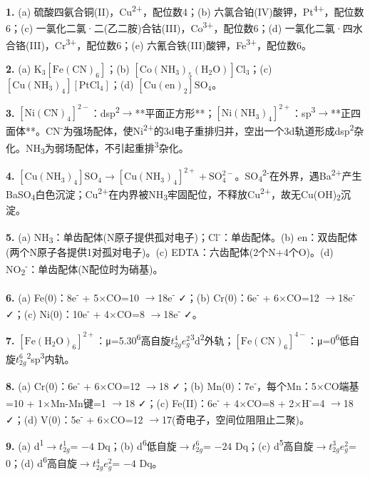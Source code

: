 \documentclass[a4paper,11pt]{ctexart}
\newcommand{\箭}{\ensuremath{\rightarrow}}
\newcommand{\左箭}{\ensuremath{\leftarrow}}
\newcommand{\上箭}{\ensuremath{\uparrow}}
\newcommand{\下箭}{\ensuremath{\downarrow}}
\newcommand{\衡}{\ensuremath{\rightleftharpoons}}
\newcommand{\双箭}{\ensuremath{\leftrightarrow}}
\newcommand{\约等于}{\ensuremath{\approx}}
\newcommand{\小于等于}{\ensuremath{\leq}}
\newcommand{\大于等于}{\ensuremath{\geq}}
\newcommand{\不等于}{\ensuremath{\neq}}
\newcommand{\西格马}{\ensuremath{\sigma}}
\newcommand{\派}{\ensuremath{\pi}}
\begin{document}
\textbf{1.} (a) 硫酸四氨合铜(II)，Cu\textsuperscript{2+}，配位数4；(b) 六氯合铂(IV)酸钾，Pt\textsuperscript{4+}，配位数6；(c) 一氯化二氯·二(乙二胺)合钴(III)，Co\textsuperscript{3+}，配位数6；(d) 一氯化二氯·四水合铬(III)，Cr\textsuperscript{3+}，配位数6；(e) 六氰合铁(III)酸钾，Fe\textsuperscript{3+}，配位数6。

\textbf{2.} (a) \(\mathrm{K_3[Fe(CN)_6]}\)；(b) \(\mathrm{[Co(NH_3)_5(H_2O)]Cl_3}\)；(c) \(\mathrm{[Cu(NH_3)_4][PtCl_4]}\)；(d) \(\mathrm{[Cu(en)_2]SO_4}\)。

\textbf{3.} \(\mathrm{[Ni(CN)_4]^{2-}}\)：dsp\textsuperscript{2}\箭**平面正方形**；\(\mathrm{[Ni(NH_3)_4]^{2+}}\)：sp\textsuperscript{3}\箭**正四面体**。CN\textsuperscript{-}为强场配体，使Ni\textsuperscript{2+}的3d电子重排归并，空出一个3d轨道形成dsp\textsuperscript{2}杂化。NH\textsubscript{3}为弱场配体，不引起重排\textsuperscript{3}杂化。

\textbf{4.} \(\mathrm{[Cu(NH_3)_4]SO_4 \rightarrow [Cu(NH_3)_4]^{2+} + SO_4^{2-}}\)。SO\textsubscript{4}\textsuperscript{2-}在外界，遇Ba\textsuperscript{2+}产生BaSO\textsubscript{4}白色沉淀；Cu\textsuperscript{2+}在内界被NH\textsubscript{3}牢固配位，不释放Cu\textsuperscript{2+}，故无Cu(OH)\textsubscript{2}沉淀。

\textbf{5.} (a) NH\textsubscript{3}：单齿配体(N原子提供孤对电子)；Cl\textsuperscript{-}：单齿配体。(b) en：双齿配体(两个N原子各提供1对孤对电子)。(c) EDTA：六齿配体(2个N+4个O)。(d) NO\textsubscript{2}\textsuperscript{-}：单齿配体(N配位时为硝基)。

\textbf{6.} (a) Fe(0)：8e\textsuperscript{-} + 5×CO=10 \箭 18e\textsuperscript{-} ✓；(b) Cr(0)：6e\textsuperscript{-} + 6×CO=12 \箭 18e\textsuperscript{-} ✓；(c) Ni(0)：10e\textsuperscript{-} + 4×CO=8 \箭 18e\textsuperscript{-} ✓。

\textbf{7.} \(\mathrm{[Fe(H_2O)_6]^{2+}}\)：μ=5.30\textsuperscript{6}高自旋\(t_{2g}^4 e_g^2\)\textsuperscript{3}d\textsuperscript{2}外轨；\(\mathrm{[Fe(CN)_6]^{4-}}\)：μ=0\textsuperscript{6}低自旋\(t_{2g}^6\)\textsuperscript{2}sp\textsuperscript{3}内轨。

\textbf{8.} (a) Cr(0)：6e\textsuperscript{-} + 6×CO=12 \箭 18 ✓；(b) Mn(0)：7e\textsuperscript{-}，每个Mn：5×CO端基=10 + 1×Mn-Mn键=1 \箭 18 ✓；(c) Fe(II)：6e\textsuperscript{-} + 4×CO=8 + 2×H\textsuperscript{-}=4 \箭 18 ✓；(d) V(0)：5e\textsuperscript{-} + 6×CO=12 \箭 17(奇电子，空间位阻阻止二聚)。

\textbf{9.} (a) d\textsuperscript{1}\箭\(t_{2g}^1\) = \(-4\) Dq；(b) d\textsuperscript{6}低自旋\箭\(t_{2g}^6\) = \(-24\) Dq；(c) d\textsuperscript{5}高自旋\箭\(t_{2g}^3 e_g^2\) = 0；(d) d\textsuperscript{6}高自旋\箭\(t_{2g}^4 e_g^2\) = \(-4\) Dq。
\end{document}
